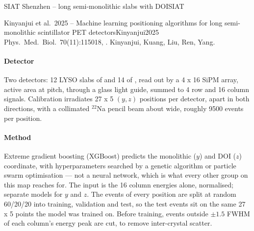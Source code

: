 \begin{programnote}{SIAT Shenzhen -- long semi-monolithic slabs with DOI}{SIAT}
\begin{papernote}{Kinyanjui et al.\ 2025 -- Machine learning positioning algorithms for long semi-monolithic scintillator PET detectors}{Kinyanjui2025}
Phys.\ Med.\ Biol.\ 70(11):115018, . Kinyanjui,
Kuang, Liu, Ren, Yang.

\paragraph{Detector}
Two detectors: 12 LYSO slabs of  and 14 of
, read out by a 4 x 16 SiPM array,  active area at  pitch, through
a  glass light guide, summed to 4 row and 16 column signals.
Calibration irradiates 27 x 5 $(y, z)$ positions per detector,  apart in
both directions, with a collimated $^{22}$Na pencil beam about  wide,
roughly 9500 events per position.

\paragraph{Method}
Extreme gradient boosting (XGBoost) predicts the monolithic ($y$) and DOI
($z$) coordinate, with hyperparameters searched by a genetic algorithm or
particle swarm optimisation --- not a neural network, which is what every
other group on this map reaches for. The input is the 16 column energies
alone, normalised; separate models for $y$ and $z$. The events of every
position are split at random 60/20/20 into training, validation and test, so
the test events sit on the same 27 x 5 points the model was trained on.
Before training, events outside $\pm1.5$ FWHM of each column's energy peak
are cut, to remove inter-crystal scatter.


\end{papernote}
\end{programnote}
